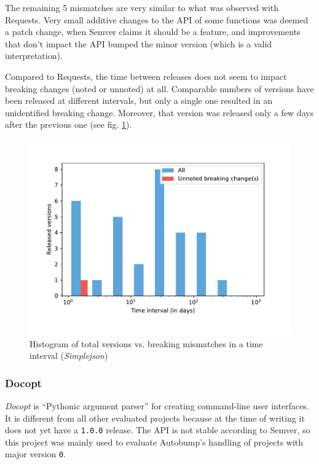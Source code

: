 \documentclass{l4proj}
\newcommand\genericstyle{\lstset{basicstyle=\ttm}}
\newcommand\codeinline[1]{{\genericstyle\lstinline!#1!}}
\begin{document}
The remaining 5 mismatches are very similar to what was observed with
Requests. Very small additive changes to the API of some functions was
deemed a patch change, when Semver claims it should be a feature, and
improvements that don't impact the API bumped the minor version (which
is a valid interpretation).

Compared to Requests, the time between releases does not seem
to impact breaking changes (noted or unnoted) at all. Comparable
numbers of versions have been released at different intervals, but
only a single one resulted in an unidentified breaking change.
Moreover, that version was released only a few days after the previous
one (see fig. \ref{SimplejsonHistogram}).

\begin{figure}[H]
\centering
\includegraphics[height=0.32\textheight]
{images/evaluation/simplejson_introduced_changes}
\caption{Histogram of total versions vs. breaking mismatches in a time
interval (\textit{Simplejson})}
\label{SimplejsonHistogram}
\end{figure}

\subsubsection{Docopt}

\textit{Docopt} \cite{Docopt} is ``Pythonic argument parser'' for
creating command-line user interfaces. It is different from all other
evaluated projects because at the time of writing it does not yet have
a \codeinline{1.0.0} release. The API is not stable according to
Semver, so this project was mainly used to evaluate Autobump's
handling of projects with major version \codeinline{0}.
\end{document}
